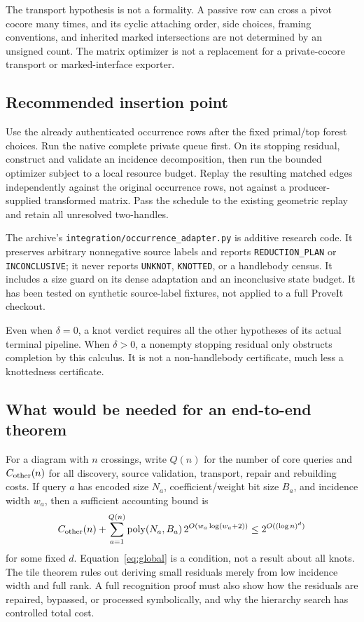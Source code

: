 \documentclass[11pt,a4paper]{article}
\theoremstyle{definition}
\theoremstyle{remark}
\newcommand{\code}[1]{\nolinkurl{#1}}
\begin{document}
The transport hypothesis is not a formality. A passive row can cross a
pivot cocore many times, and its cyclic attaching order, side choices,
framing conventions, and inherited marked intersections are not determined
by an unsigned count. The matrix optimizer is not a replacement for a
private-cocore transport or marked-interface exporter.

\subsection{Recommended insertion point}
Use the already authenticated occurrence rows after the fixed primal/top
forest choices. Run the native complete private queue first. On its
stopping residual, construct and validate an incidence decomposition,
then run the bounded optimizer subject to a local resource budget. Replay
the resulting matched edges independently against the original occurrence
rows, not against a producer-supplied transformed matrix. Pass the schedule
to the existing geometric replay and retain all unresolved two-handles.

The archive's \code{integration/occurrence_adapter.py} is additive research
code. It preserves arbitrary nonnegative source labels and reports
\code{REDUCTION_PLAN} or \code{INCONCLUSIVE}; it never reports
\code{UNKNOT}, \code{KNOTTED}, or a handlebody census. It includes a
size guard on its dense adaptation and an inconclusive state budget.
It has been tested on synthetic source-label fixtures, not applied to a
full ProveIt checkout.

Even when $\delta=0$, a knot verdict requires all the other hypotheses of
its actual terminal pipeline. When $\delta>0$, a nonempty stopping residual
only obstructs completion by this calculus. It is not a non-handlebody
certificate, much less a knottedness certificate.

\subsection{What would be needed for an end-to-end theorem}
For a diagram with $n$ crossings, write $Q(n)$ for the number of core
queries and $C_{\rm other}(n)$ for all discovery, source validation,
transport, repair and rebuilding costs. If query $a$ has encoded size
$N_a$, coefficient/weight bit size $B_a$, and incidence width $w_a$, then a
sufficient accounting bound is
\begin{equation}
 C_{\rm other}(n)+\sum_{a=1}^{Q(n)}
 \operatorname{poly}(N_a,B_a)\,2^{O(w_a\log(w_a+2))}
 \leq 2^{O((\log n)^d)}
 \label{eq:global}
\end{equation}
for some fixed $d$. Equation~\eqref{eq:global} is a condition, not a result
about all knots. The tile theorem rules out deriving small residuals merely
from low incidence width and full rank. A full recognition proof must also
show how the residuals are repaired, bypassed, or processed symbolically,
and why the hierarchy search has controlled total cost.
\end{document}
